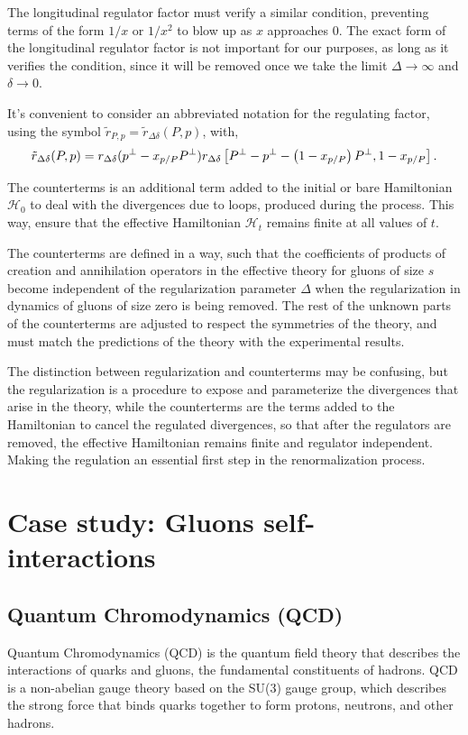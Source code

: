 \documentclass[11pt,a4paper,twoside,pdf]{article}
\numberwithin{equation}{section}
\begin{document}
The longitudinal regulator factor must verify a similar condition, preventing terms
of the form $1/x$ or $1/x^2$ to blow up as $x$ approaches 0. The exact form of the 
longitudinal regulator factor is not important for our purposes, as long as it 
verifies the condition, since it will be removed once we take the
limit $\Delta \to \infty$ and $\delta \to 0$.

It's convenient to consider an abbreviated notation for the regulating factor, 
using the symbol $\tilde{r}_{P, p} = \tilde{r}_{\Delta \delta} (P,p)$, with,
\begin{equation}
    \tilde{r}_{\Delta \delta} (P,p) = r_{\Delta \delta} (p^\perp - x_{p/P}P^\perp) 
    r_{\Delta \delta}\left[ P^\perp-p^\perp-\left( 1-x_{p/P} \right)P^\perp, 1-x_{p/P} \right].
\end{equation}

The counterterms is an additional term added to the initial or bare Hamiltonian 
$\mathcal{H}_0$ to deal with the divergences due to loops, produced during the 
process. This way, ensure that the effective Hamiltonian $\mathcal{H}_t$ remains 
finite at all values of $t$.

The counterterms are defined in a way, such that the coefficients of products 
of creation and annihilation operators in the effective theory for gluons of size $s$
become independent of the regularization parameter $\Delta$ when the regularization
in dynamics of gluons of size zero is being removed. The rest of the unknown parts 
of the counterterms are adjusted to respect the symmetries of the theory, and must 
match the predictions of the theory with the experimental results.

The distinction between regularization and counterterms may be confusing, but the
regularization is a procedure to expose and parameterize the divergences that arise
in the theory, while the counterterms are the terms added to the Hamiltonian to 
cancel the regulated divergences, so that after the regulators are removed, the 
effective Hamiltonian remains finite and regulator independent. Making the 
regulation an essential first step in the renormalization process.

\newpage

\section{Case study: Gluons self-interactions} \label{sec:cases}

\subsection{Quantum Chromodynamics (QCD)}
Quantum Chromodynamics (QCD) is the quantum field theory that describes the
interactions of quarks and gluons, the fundamental constituents of hadrons.
QCD is a non-abelian gauge theory based on the SU(3) gauge group, which describes
the strong force that binds quarks together to form protons, neutrons, and other
hadrons. 
\end{document}

